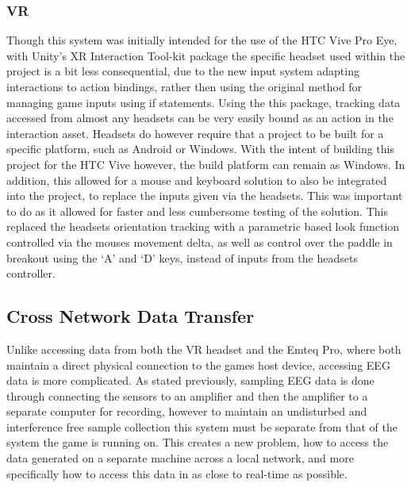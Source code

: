 \documentclass[11pt, a4paper]{article}
\begin{document}
\subsubsection{VR}	
Though this system was initially intended for the use of the HTC Vive Pro Eye, with Unity's XR Interaction Tool-kit package the specific headset used within the project is a bit less consequential, due to the new input system adapting interactions to action bindings, rather then using the original method for managing game inputs using if statements. Using the this package, tracking data accessed from almost any headsets can be very easily bound as an action in the interaction asset. Headsets do however require that a project to be built for a specific platform, such as Android or Windows. With the intent of building this project for the HTC Vive however, the build platform can remain as Windows. In addition, this allowed for a mouse and keyboard solution to also be integrated into the project, to replace the inputs given via the headsets. This was important to do as it allowed for faster and less cumbersome testing of the solution. This replaced the headsets orientation tracking with a parametric based look function controlled via the mouses movement delta, as well as control over the paddle in breakout using the `A' and `D' keys, instead of inputs from the headsets controller.




\pagebreak
\subsection{Cross Network Data Transfer}	
Unlike accessing data from both the VR headset and the Emteq Pro, where both maintain a direct physical connection to the games host device, accessing EEG data is more complicated. As stated previously, sampling EEG data is done through connecting the sensors to an amplifier and then the amplifier to a separate computer for recording, however to maintain an undisturbed and interference free sample collection this system must be separate from that of the system the game is running on. This creates a new problem, how to access the data generated on a separate machine across a local network, and more specifically how to access this data in as close to real-time as possible.
\end{document}
